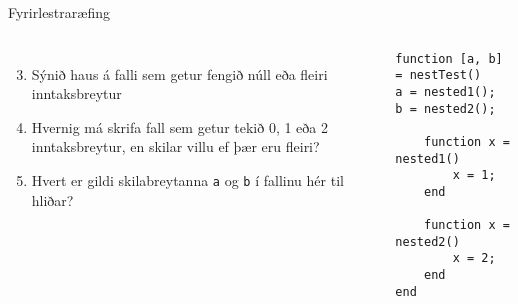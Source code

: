 \documentclass[handout]{beamer}
\begin{document}
\begin{frame}[fragile]{Fyrirlestraræfing}
    \begin{columns}
    \begin{enumerate}
     \setcounter{enumi}{2}
     \item Sýnið haus á falli sem getur fengið núll eða fleiri inntaksbreytur
     \item Hvernig má skrifa fall sem getur tekið 0, 1 eða 2 inntaksbreytur, en skilar villu ef þær eru fleiri?
     \item Hvert er gildi skilabreytanna \texttt{a} og \texttt{b} í fallinu hér til hliðar?
    \end{enumerate}
    \begin{verbatim}
function [a, b] = nestTest()
a = nested1();
b = nested2();

    function x = nested1()
        x = 1;
    end

    function x = nested2()
        x = 2;
    end
end
    \end{verbatim}
    
    \end{columns}
\end{frame}
\end{document}
